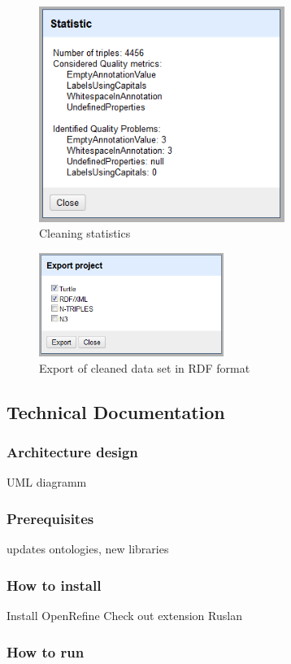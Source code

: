 \begin{figure}[ht!]
\centering
\includegraphics[width=8cm]{figures/statistics.png}
\caption{Cleaning statistics}
\label{fig:statistics}
\end{figure}


\begin{figure}[ht!]
\centering
\includegraphics[width=6cm]{figures/export.png}
\caption{Export of cleaned data set in RDF format}
\label{fig:export}
\end{figure}




\subsection{Technical Documentation}


\subsubsection{Architecture design}
UML diagramm
\subsubsection{Prerequisites}
updates ontologies,
new libraries

\subsubsection{How to install}
Install OpenRefine
Check out extension
Ruslan
\subsubsection{How to run}



